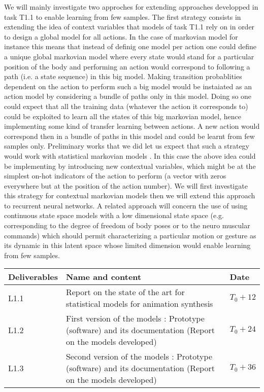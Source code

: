 We will mainly investigate two approches for extending approaches developped in task T1.1 to enable learning from few samples. The first strategy consists in extending the idea of context variables that models of task T1.1 rely on in order to design a global model for all actions.
In the case of markovian model for instance this means that instead of definig one model per action one could define a unique global markovian model where every state would stand for a particular position of the body and performing an action would correspond to following a path (i.e. a state sequence) in this big model. 
Making transition probablities dependent on the action to perform such a big model would be instaiated as an action model by considering a bundle of paths only in this model.  Doing so one could expect that all the training data (whatever the action it corresponds to) could be exploited to learn all the states of this big markovian model, hence implementing some kind of transfer learning between actions. 
A new action would correspond then in a bundle of paths in this model and could be learnt from few samples only. Preliminary works that we did let us expect that such a strategy would work with statistical markovian models \cite{DBLP:conf/icassp/DingRAP13, RadenenThesis}. In this case the above idea could be implementing by introducing new contextual variables, which might be at the simplest on-hot indicators of the action to perform (a vector with zeros everywhere but at the position of the action number). We will first investigate this strategy for contextual markovian models then we will extend this approach to recurrent neural networks.
A related approach will concern the use of using continuous state space models with a low dimensional state space (e.g. corresponding to the degree of freedom of body poses or to the neuro muscular commands) which should permit characterizing a particular motion or gesture as its dynamic in this latent space whose limited dimension would enable learning from few samples.


\begin{tabular}{|p{3cm}|p{10cm}|p{1.5cm}|}\hline
Deliverables & Name and content  & Date  \\\hline
L1.1  & Report on the state of the art for statistical models for animation synthesis &  $T_0+12$ \\\hline
L1.2  & First version of the models : Prototype (software) and its documentation (Report on the models developed) & $T_0+24$ \\\hline
L1.3  & Second version of the models : Prototype (software) and its documentation (Report on the models developed)  & $T_0+36$ \\\hline
\end{tabular}

